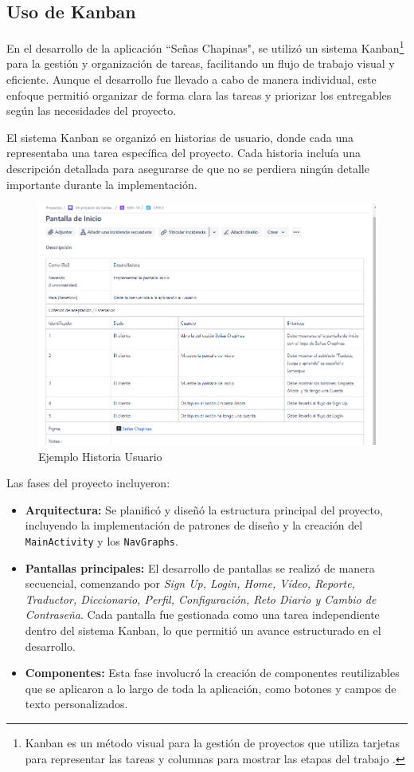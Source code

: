 
\subsection{Uso de Kanban}

En el desarrollo de la aplicación ``Señas Chapinas", se utilizó un sistema Kanban\footnote{Kanban es un método visual para la gestión de proyectos que utiliza tarjetas para representar las tareas y columnas para mostrar las etapas del trabajo \cite{asana2024}.} para la gestión y organización de tareas, facilitando un flujo de trabajo visual y eficiente. Aunque el desarrollo fue llevado a cabo de manera individual, este enfoque permitió organizar de forma clara las tareas y priorizar los entregables según las necesidades del proyecto.

El sistema Kanban se organizó en historias de usuario, donde cada una representaba una tarea específica del proyecto. Cada historia incluía una descripción detallada para asegurarse de que no se perdiera ningún detalle importante durante la implementación.

\begin{figure}  [H]
    \centering
    \includegraphics[width=0.6\linewidth]{figuras/kabana_ejemplo.png}
    \caption{Ejemplo Historia Usuario}
    \label{fig:enter-label}
\end{figure}


Las fases del proyecto incluyeron:

\begin{itemize}
    \item \textbf{Arquitectura:} Se planificó y diseñó la estructura principal del proyecto, incluyendo la implementación de patrones de diseño y la creación del \texttt{MainActivity} y los \texttt{NavGraphs}.
    \item \textbf{Pantallas principales:} El desarrollo de pantallas se realizó de manera secuencial, comenzando por\textit{ Sign Up, Login, Home, Vídeo, Reporte, Traductor, Diccionario, Perfil, Configuración, Reto Diario y Cambio de Contraseña}. Cada pantalla fue gestionada como una tarea independiente dentro del sistema Kanban, lo que permitió un avance estructurado en el desarrollo.
    \item \textbf{Componentes:} Esta fase involucró la creación de componentes reutilizables que se aplicaron a lo largo de toda la aplicación, como botones y campos de texto personalizados.
\end{itemize}

